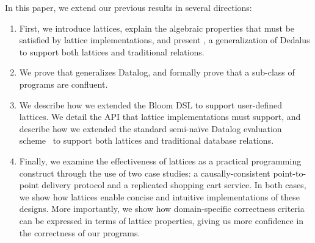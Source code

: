 In this paper, we extend our previous results in several directions:
\begin{enumerate}
\item
  First, we introduce lattices, explain the algebraic properties that must be
  satisfied by lattice implementations, and present \latlang, a generalization
  of Dedalus to support both lattices and traditional relations.

\item
  We prove that \latlang generalizes Datalog, and formally prove that a sub-class of
  \latlang programs are confluent.

\item
  We describe how we extended the Bloom DSL to support user-defined lattices. We
  detail the API that lattice implementations must support, and describe how we
  extended the standard semi-na\"{i}ve Datalog evaluation scheme~\cite{Balbin1987}
  to support both lattices and traditional database relations.

\item
  Finally, we examine the effectiveness of lattices as a practical programming
  construct through the use of two case studies: a causally-consistent
  point-to-point delivery protocol and a replicated shopping cart service. In
  both cases, we show how lattices enable concise and intuitive implementations
  of these designs. More importantly, we show how domain-specific correctness
  criteria can be expressed in terms of lattice properties, giving us more
  confidence in the correctness of our programs.
\end{enumerate}
